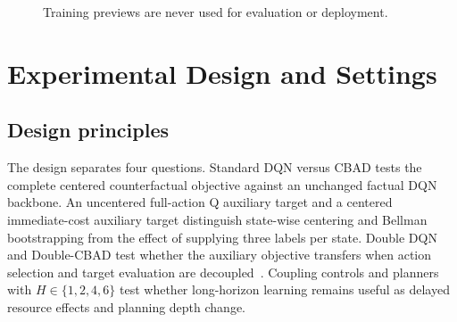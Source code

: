 \documentclass[11pt]{article}
\begin{document}
\begin{figure}[H]
\centering
{}
\par\smallskip
\caption*{Training previews are never used for evaluation or deployment.}
\label{alg:cbad}
\end{figure}

\section{Experimental Design and Settings}
\label{sec:experiments}

\subsection{Design principles}

{\color{red}%
The design separates four questions. Standard DQN versus CBAD tests the complete centered counterfactual objective against an unchanged factual DQN backbone. An uncentered full-action Q auxiliary target and a centered immediate-cost auxiliary target distinguish state-wise centering and Bellman bootstrapping from the effect of supplying three labels per state. Double DQN and Double-CBAD test whether the auxiliary objective transfers when action selection and target evaluation are decoupled~\cite{vanhasselt2016double}. Coupling controls and planners with $H\in\{1,2,4,6\}$ test whether long-horizon learning remains useful as delayed resource effects and planning depth change.
}%
\end{document}
